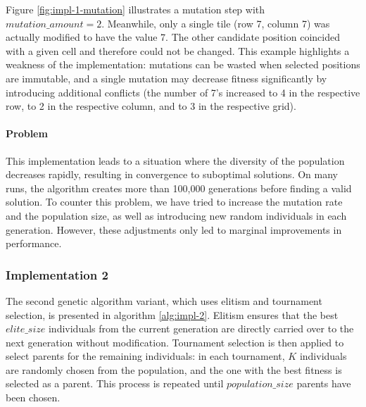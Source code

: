Figure \ref{fig:impl-1-mutation} illustrates a mutation step with $mutation\_amount =2$. Meanwhile, only a single tile (row 7, column 7) was actually modified to have the value 7. The other candidate position coincided with a given cell and therefore could not be changed. This example highlights a weakness of the implementation: mutations can be wasted when selected positions are immutable, and a single mutation may decrease fitness significantly by introducing additional conflicts (the number of 7's increased to 4 in the respective row, to 2 in the respective column, and to 3 in the respective grid).

\paragraph{Problem}
This implementation leads to a situation where the diversity of the population decreases rapidly, resulting in convergence to suboptimal solutions. On many runs, the algorithm creates more than 100,000 generations before finding a valid solution.  
To counter this problem, we have tried to increase the mutation rate and the population size, as well as introducing new random individuals in each generation. However, these adjustments only led to marginal improvements in performance.

\subsubsection{Implementation 2}
The second genetic algorithm variant, which uses elitism and tournament selection, is presented in algorithm \ref{alg:impl-2}. 
Elitism ensures that the best $elite\_size$ individuals from the current generation are directly carried over to the next generation without modification.
Tournament selection is then applied to select parents for the remaining individuals: in each tournament, $K$ individuals are randomly chosen from the population, and the one with the best fitness is selected as a parent. This process is repeated until $population\_size$ parents have been chosen.

